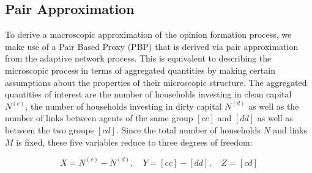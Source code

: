 \subsection{Pair Approximation}

To derive a macroscopic approximation of the opinion formation process, we make use of a Pair Based Proxy (PBP) that is derived via pair approximation from the adaptive network process. This is equivalent to describing the microscopic process in terms of aggregated quantities by making certain assumptions about the properties of their microscopic structure. The aggregated quantities of interest are the number of households investing in clean capital $N^{(c)}$, the number of households investing in dirty capital $N^{(d)}$ as well as the number of links between agents of the same group $[cc]$ and $[dd]$ as well as between the two groups $[cd]$. Since the total number of households $N$ and links $M$ is fixed, these five variables reduce to three degrees of freedom:

\begin{equation}
	X = N^{(c)} - N^{(d)}, \quad Y = [cc] - [dd], \quad Z = [cd]
	\label{eq:opinion_formation_macro_variables}
\end{equation}


